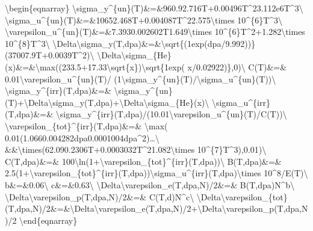 \documentclass[letterpaper,10pt,english]{jupyterBook}
\begin{document}
	\sphinxAtStartPar
	\textbackslash{}begin\{eqnarray\}
	\textbackslash{}sigma\_y\textasciicircum{}\{un\}(T)\&=\&960.9\sphinxhyphen{}2.716T+0.00496T\textasciicircum{}2\sphinxhyphen{}3.112e\sphinxhyphen{}6T\textasciicircum{}3\textbackslash{}
	\textbackslash{}sigma\_u\textasciicircum{}\{un\}(T)\&=\&1065\sphinxhyphen{}2.468T+0.004087T\textasciicircum{}2\sphinxhyphen{}2.575\textbackslash{}times 10\textasciicircum{}\{\sphinxhyphen{}6\}T\textasciicircum{}3\textbackslash{}
	\textbackslash{}varepsilon\_u\textasciicircum{}\{un\}(T)\&=\&7.393\sphinxhyphen{}0.002602T\sphinxhyphen{}1.649\textbackslash{}times 10\textasciicircum{}\{\sphinxhyphen{}6\}T\textasciicircum{}2+1.282\textbackslash{}times 10\textasciicircum{}\{\sphinxhyphen{}8\}T\textasciicircum{}3\textbackslash{}
	\textbackslash{}Delta\textbackslash{}sigma\_y(T,dpa)\&=\&\textbackslash{}sqrt\{(1\sphinxhyphen{}exp(\sphinxhyphen{}dpa/9.992))\}(3700\sphinxhyphen{}7.9T+0.0039T\textasciicircum{}2)\textbackslash{}
	\textbackslash{}Delta\textbackslash{}sigma\_\{He\}(x)\&=\&\textbackslash{}max((\sphinxhyphen{}233.5+17.33\textbackslash{}sqrt\{x\})\textbackslash{}sqrt\{1\sphinxhyphen{}exp(\sphinxhyphen{} x/0.02922)\},0)\textbackslash{}
	C(T)\&=\& 0.01\textbackslash{}varepsilon\_u\textasciicircum{}\{un\}(T)/ (1\sphinxhyphen{}\textbackslash{}sigma\_y\textasciicircum{}\{un\}(T)/\textbackslash{}sigma\_u\textasciicircum{}\{un\}(T))\textbackslash{}
	\textbackslash{}sigma\_y\textasciicircum{}\{irr\}(T,dpa)\&=\& \textbackslash{}sigma\_y\textasciicircum{}\{un\}(T)+\textbackslash{}Delta\textbackslash{}sigma\_y(T,dpa)+\textbackslash{}Delta\textbackslash{}sigma\_\{He\}(x)\textbackslash{}
	\textbackslash{}sigma\_u\textasciicircum{}\{irr\}(T,dpa)\&=\& \textbackslash{}sigma\_y\textasciicircum{}\{irr\}(T,dpa)/(1\sphinxhyphen{}0.01\textbackslash{}varepsilon\_u\textasciicircum{}\{un\}(T)/C(T))\textbackslash{}
	\textbackslash{}varepsilon\_\{tot\}\textasciicircum{}\{irr\}(T,dpa)\&=\& \textbackslash{}max( 0.01(1.066\sphinxhyphen{}0.004282dpa\sphinxhyphen{}0.0001004dpa\textasciicircum{}2)…\textbackslash{}
	\&\&\textbackslash{}times(62.09\sphinxhyphen{}0.2306T+0.0003032T\textasciicircum{}2\sphinxhyphen{}1.082\textbackslash{}times 10\textasciicircum{}\{\sphinxhyphen{}7\}T\textasciicircum{}3),0.01)\textbackslash{}
	C(T,dpa)\&=\& 100\textbackslash{}ln(1+\textbackslash{}varepsilon\_\{tot\}\textasciicircum{}\{irr\}(T,dpa))\textbackslash{}
	B(T,dpa)\&=\&  2.5(1+\textbackslash{}varepsilon\_\{tot\}\textasciicircum{}\{irr\}(T,dpa))\textbackslash{}sigma\_u\textasciicircum{}\{irr\}(T,dpa)\textbackslash{}times 10\textasciicircum{}8/E(T)\textbackslash{}
	b\&=\&\sphinxhyphen{}0.06\textbackslash{}
	c\&=\&\sphinxhyphen{}0.63\textbackslash{}
	\textbackslash{}Delta\textbackslash{}varepsilon\_e(T,dpa,N)/2\&=\& B(T,dpa)N\textasciicircum{}b\textbackslash{}
	\textbackslash{}Delta\textbackslash{}varepsilon\_p(T,dpa,N)/2\&=\& C(T,d)N\textasciicircum{}c\textbackslash{}
	\textbackslash{}Delta\textbackslash{}varepsilon\_\{tot\}(T,dpa,N)/2\&=\&\textbackslash{}Delta\textbackslash{}varepsilon\_e(T,dpa,N)/2+\textbackslash{}Delta\textbackslash{}varepsilon\_p(T,dpa,N)/2
	\textbackslash{}end\{eqnarray\}
	
\end{document}
